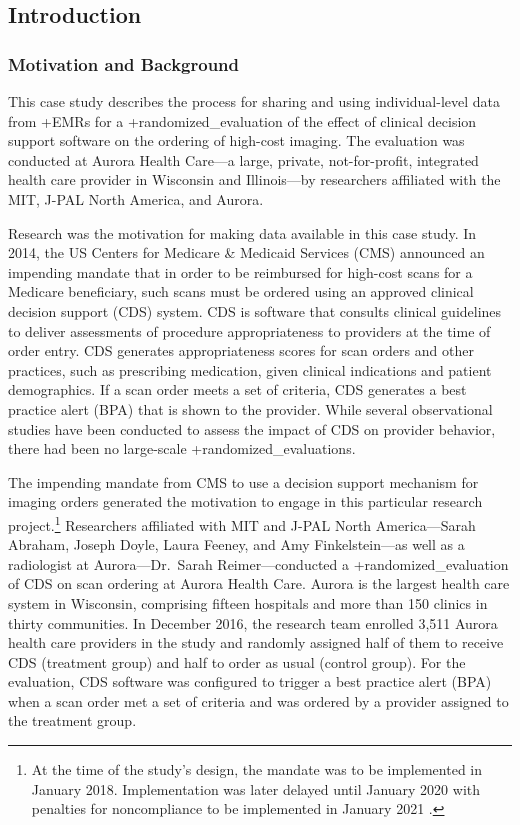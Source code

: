 \documentclass[
]{WileySix}
\begin{document}
\hypertarget{introduction-5}{%
\subsection{Introduction}\label{introduction-5}}

\hypertarget{motivation-and-background-4}{%
\subsubsection{Motivation and Background}\label{motivation-and-background-4}}

This case study describes the process for sharing and using individual-level data from +EMRs\textbar{} for a +randomized\_evaluation\textbar{} of the effect of clinical decision support software on the ordering of high-cost imaging. The evaluation was conducted at Aurora Health Care---a large, private, not-for-profit, integrated health care provider in Wisconsin and Illinois---by researchers affiliated with the MIT, J-PAL North America, and Aurora.

Research was the motivation for making data available in this case study. In 2014, the US Centers for Medicare \& Medicaid Services (CMS) announced an impending mandate that in order to be reimbursed for high-cost scans for a Medicare beneficiary, such scans must be ordered using an approved clinical decision support (CDS) system. CDS is software that consults clinical guidelines to deliver assessments of procedure appropriateness to providers at the time of order entry. CDS generates appropriateness scores for scan orders and other practices, such as prescribing medication, given clinical indications and patient demographics. If a scan order meets a set of criteria, CDS generates a best practice alert (BPA) that is shown to the provider. While several observational studies have been conducted to assess the impact of CDS on provider behavior, there had been no large-scale +randomized\_evaluations\textbar.

The impending mandate from CMS to use a decision support mechanism for imaging orders generated the motivation to engage in this particular research project.\footnote{At the time of the study's design, the mandate was to be implemented in January 2018. Implementation was later delayed until January 2020 with penalties for noncompliance to be implemented in January 2021 \citep{hentel2019, centersformedicaremedicaidservices2018}.} Researchers affiliated with MIT and J-PAL North America---Sarah Abraham, Joseph Doyle, Laura Feeney, and Amy Finkelstein---as well as a radiologist at Aurora---Dr.~Sarah Reimer---conducted a +randomized\_evaluation\textbar{} of CDS on scan ordering at Aurora Health Care. Aurora is the largest health care system in Wisconsin, comprising fifteen hospitals and more than 150 clinics in thirty communities. In December 2016, the research team enrolled 3,511 Aurora health care providers in the study and randomly assigned half of them to receive CDS (treatment group) and half to order as usual (control group). For the evaluation, CDS software was configured to trigger a best practice alert (BPA) when a scan order met a set of criteria and was ordered by a provider assigned to the treatment group.
\end{document}
